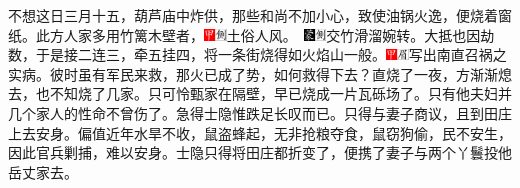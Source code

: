 不想这日三月十五，葫芦庙中炸供，那些和尚不加小心，致使油锅火逸，便烧着窗纸。此方人家多用竹篱木壁者，{{\includegraphics[width=3mm]{../Images/00002}\includegraphics[width=3mm]{../Images/00011}\footnotesize \kaishu 土俗人风。　}\includegraphics[width=3mm]{../Images/00006}\includegraphics[width=3mm]{../Images/00011}\footnotesize \kaishu 交竹滑溜婉转。}大抵也因劫数，于是接二连三，牵五挂四，将一条街烧得如火焰山一般。{\includegraphics[width=3mm]{../Images/00002}\includegraphics[width=3mm]{../Images/00010}\footnotesize \kaishu 写出南直召祸之实病。}彼时虽有军民来救，那火已成了势，如何救得下去？直烧了一夜，方渐渐熄去，也不知烧了几家。只可怜甄家在隔壁，早已烧成一片瓦砾场了。只有他夫妇并几个家人的性命不曾伤了。急得士隐惟跌足长叹而已。只得与妻子商议，且到田庄上去安身。偏值近年水旱不收，鼠盗蜂起，无非抢粮夺食，鼠窃狗偷，民不安生，因此官兵剿捕，难以安身。士隐只得将田庄都折变了，便携了妻子与两个丫鬟投他岳丈家去。

